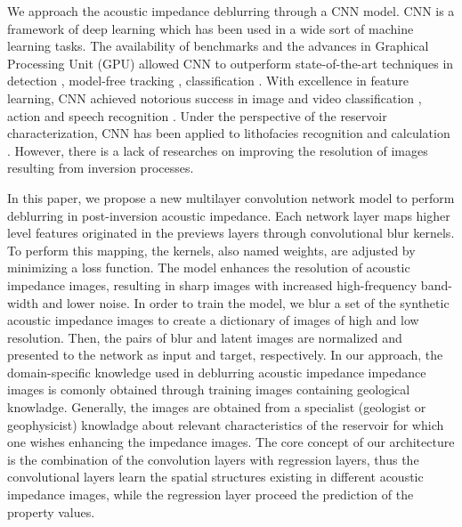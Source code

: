 \documentclass[conference]{IEEEtran}
\begin{document}
We approach  the acoustic impedance deblurring through
a CNN model. CNN is a framework of deep learning which has been
used in a wide sort of machine learning tasks. The availability of benchmarks
\cite{Russakovsky} and the advances in Graphical Processing Unit (GPU) \cite{Buduma15}
allowed CNN to outperform state-of-the-art techniques in detection \cite{Girshick2015,Bell2015}, model-free
tracking \cite{Nam}, classification \cite{He2016}. With excellence in feature learning,
CNN achieved notorious success in image and video classification \cite{Krizhevsky2012, AbdelHamid2014}, action  and speech recognition \cite{Farfade2015, S_Ji2013}.
Under the perspective of the reservoir characterization, CNN has been applied to lithofacies recognition
\cite{Qian} and calculation \cite{Liu2017}. However, there is a lack of researches on improving the resolution of
images resulting from inversion processes.

In this paper, we propose a new multilayer convolution network model to perform deblurring in post-inversion acoustic impedance.
Each network layer maps higher level features originated in the previews layers through convolutional blur kernels.
To perform this mapping, the kernels, also named weights, are adjusted by minimizing a loss function. 
The model enhances the resolution of acoustic impedance images, resulting in sharp images with
increased high-frequency band-width and lower noise.
In order to train the model, we blur a set of the synthetic acoustic impedance images to create a dictionary of
images of high and low resolution. Then, the pairs of blur and latent images are normalized and 
presented to the network as input and target, respectively.
In our approach, the domain-specific knowledge used in deblurring acoustic impedance impedance images is comonly
obtained through training images containing geological knowladge. Generally, the images are obtained from a specialist
(geologist or geophysicist) knowladge about relevant characteristics of the reservoir for which one wishes enhancing the impedance images.
The core concept of our architecture is the combination of the convolution layers with regression
layers, thus the convolutional layers learn the spatial structures existing in different
acoustic impedance images, while the regression layer proceed the prediction of the property values.
\end{document}
